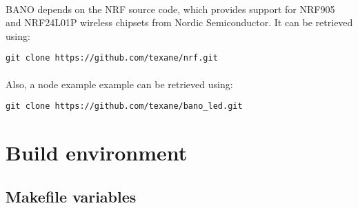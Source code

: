 \documentclass[a4paper, 11pt]{article}
\begin{document}
\paragraph{}
BANO depends on the NRF source code, which provides support for
NRF905 and NRF24L01P wireless chipsets from Nordic Semiconductor.
It can be retrieved using:
\begin{scriptsize}
\begin{verbatim}
git clone https://github.com/texane/nrf.git
\end{verbatim}
\end{scriptsize}

\paragraph{}
Also, a node example example can be retrieved using:
\begin{scriptsize}
\begin{verbatim}
git clone https://github.com/texane/bano_led.git
\end{verbatim}
\end{scriptsize}

\clearpage
\section{Build environment}

\subsection{Makefile variables}
\end{document}
